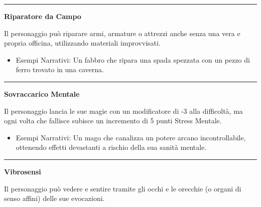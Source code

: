 \documentclass[../manuale_main.tex]{subfiles}
\begin{document}
\vspace{0.5cm}
\noindent
\begin{center}
\rule{\textwidth}{0.4pt} 
\end{center}
\vspace{0.5cm}

\begin{center}
\textbf{\large{Riparatore da Campo}}\\
\end{center}
Il personaggio può riparare armi, armature o attrezzi anche senza una vera e propria officina, utilizzando materiali improvvisati.

\begin{itemize}
\item Esempi Narrativi: Un fabbro che ripara una spada spezzata con un pezzo di ferro trovato in una caverna.
\end{itemize}

\vspace{0.5cm}
\noindent
\begin{center}
\rule{\textwidth}{0.4pt} 
\end{center}
\vspace{0.5cm}

\begin{center}
\textbf{\large{Sovraccarico Mentale}}\\
\end{center}
Il personaggio lancia le sue magie con un modificatore di -3 alla difficoltà, ma ogni volta che fallisce subisce un incremento di 5 punti Stress Mentale.

\begin{itemize}
\item Esempi Narrativi: Un mago che canalizza un potere arcano incontrollabile, ottenendo effetti devastanti a rischio della sua sanità mentale.
\end{itemize}

\vspace{0.5cm}
\noindent
\begin{center}
\rule{\textwidth}{0.4pt} 
\end{center}
\vspace{0.5cm}

\begin{center}
\textbf{\large{Vibrosensi}}\\
\end{center}
Il personaggio può vedere e sentire tramite gli occhi e le orecchie (o organi di senso affini) delle sue evocazioni.
\end{document}
